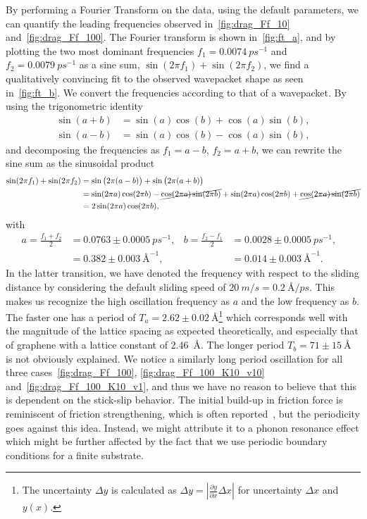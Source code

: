 By performing a Fourier Transform on the data, using the default parameters, we can quantify the leading frequencies observed in~\cref{fig:drag_Ff_10} and~\cref{fig:drag_Ff_100}. The Fourier transform is shown in~\cref{fig:ft_a}, and by plotting the two most dominant frequencies $f_1 = \SI{0.0074}{ps^{-1}}$ and $f_2 = \SI{0.0079}{ps^{-1}}$ as a sine sum, $\sin{(2\pi f_1)} + \sin{(2\pi f_2)}$, we find a qualitatively convincing fit to the observed wavepacket shape as seen in~\cref{fig:ft_b}. We convert the frequencies according to that of a wavepacket. By using the trigonometric identity
\begin{align*}
\sin (a+b) &= \sin (a) \cos (b) + \cos (a) \sin (b), \\
\sin (a-b) &= \sin (a) \cos (b) - \cos (a) \sin (b),
\end{align*}
and decomposing the frequencies as $f_1 = a - b$, $f_2 = a + b$, we can rewrite the sine sum as the sinusoidal product
\begin{align*}
  \sin(2\pi f_1) + \sin(2\pi f_2) &= \sin\big(2\pi (a - b)\big) + \sin\big(2\pi (a + b)\big) \\
  &= \sin(2\pi a)\cos(2\pi b) - \cancel{\cos(2\pi a)\sin(2\pi b)} + \sin(2\pi a)\cos(2\pi b) + \cancel{\cos(2\pi a)\sin(2\pi b)} \\
  &= 2 \sin(2\pi a) \cos(2\pi b),
\end{align*} 
with 
\begin{align*}
  a = \frac{f_1 + f_2}{2} &= 0.0763 \pm \SI{0.0005}{ps^{-1}},& 
  b = \frac{f_2 - f_1}{2} &= 0.0028 \pm \SI{0.0005}{ps^{-1}},& \\
  &= 0.382 \pm \SI{0.003}{{\text{Å}}^{-1}},& 
  &= 0.014 \pm \SI{0.003}{{\text{Å}}^{-1}}.& 
\end{align*}
In the latter transition, we have denoted the frequency with respect to the sliding distance by considering the default sliding speed of $\SI{20}{m/s} = \SI{0.2}{\text{Å}/ps}$. This makes us recognize the high oscillation frequency as $a$ and the low frequency
as $b$. The faster one has a period of $T_a = 2.62 \pm \SI{0.02}{\text{Å}}$\footnote{The
uncertainty $\Delta y$ is calculated as $\Delta y = \left|\frac{\partial
y}{\partial x} \Delta x \right|$ for uncertainty $\Delta x$ and $y(x)$.} which
corresponds well with the magnitude of the lattice spacing as expected theoretically, and especially that of
graphene with a lattice constant of \SI{2.46}{Å}. The longer period $T_b = 71 \pm
\SI{15}{\text{Å}}$ is not obviously explained. We notice a similarly long period oscillation for all three cases~\cref{fig:drag_Ff_100}, \cref{fig:drag_Ff_100_K10_v10} and~\cref{fig:drag_Ff_100_K10_v1}, and thus we have no reason to believe that this is dependent on the stick-slip behavior. The initial build-up in friction force is reminiscent of friction strengthening, which is often reported~\cite{zhang_tuning_2019, li_evolving_2016}, but the periodicity goes against this idea. Instead, we might attribute it to a phonon
resonance effect which might be further affected by the fact that we use periodic boundary conditions for a finite substrate.

